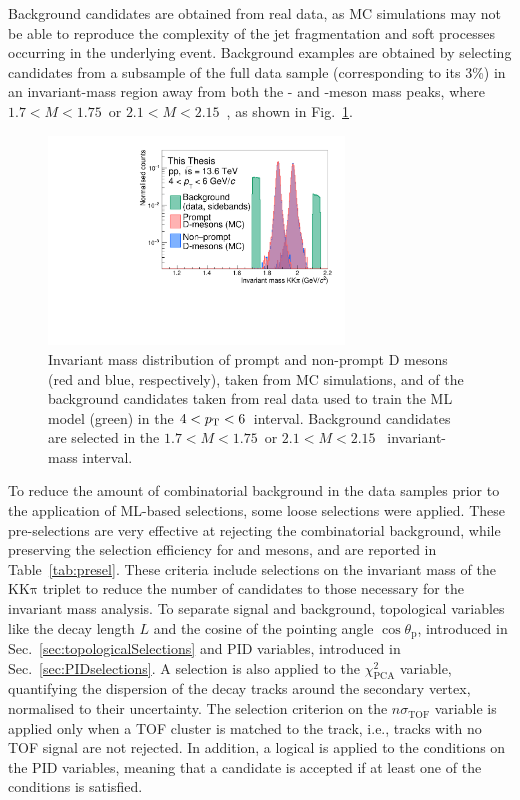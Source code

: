 Background candidates are obtained from real data, as MC simulations may not be able to reproduce the complexity of the jet fragmentation and soft processes occurring in the underlying event. Background examples are obtained by selecting candidates from a subsample of the full data sample (corresponding to its 3\%) in an invariant-mass region away from both the \ds- and \dpl-meson mass peaks, where $1.7 < M < 1.75$~\gevcc or \mbox{$2.1 < M < 2.15$~\gevcc}, as shown in Fig.~\ref{fig:ml_training_mass}. 
\begin{figure}[htb]
    \centering
    \includegraphics[width=0.7\textwidth]{Figures/Chapter 5/Mass.pdf}
    \caption{Invariant mass distribution of prompt and non-prompt D mesons (red and blue, respectively), taken from MC simulations, and of the background candidates taken from real data used to train the ML model (green) in the $4<p_\mathrm{T}<6$~\gevc interval. Background candidates are selected in the $1.7 < M < 1.75$~\gevcc or \mbox{$2.1 < M < 2.15$~\gevcc} invariant-mass interval.}
    \label{fig:ml_training_mass}
\end{figure}

To reduce the amount of combinatorial background in the data samples prior to the application of ML-based selections, some loose selections were applied. These pre-selections are very effective at rejecting the combinatorial background, while preserving the selection efficiency for \ds and \dpl mesons, and are reported in Table~\ref{tab:presel}. These criteria include selections on the invariant mass of the $\mathrm{KK\pi}$ triplet to reduce the number of candidates to those necessary for the invariant mass analysis. To separate signal and background, topological variables like the decay length $L$ and the cosine of the pointing angle $\cos\theta_\mathrm{p}$, introduced in Sec.~\ref{sec:topologicalSelections} and PID variables, introduced in Sec.~\ref{sec:PIDselections}. A selection is also applied to the $\chi^2_\mathrm{PCA}$ variable, quantifying the dispersion of the decay tracks around the secondary vertex, normalised to their uncertainty. The selection criterion on the $n\sigma_\mathrm{TOF}$ variable is applied only when a TOF cluster is matched to the track, i.e., tracks with no TOF signal are not rejected. In addition, a logical  is applied to the conditions on the PID variables, meaning that a candidate is accepted if at least one of the conditions is satisfied.

